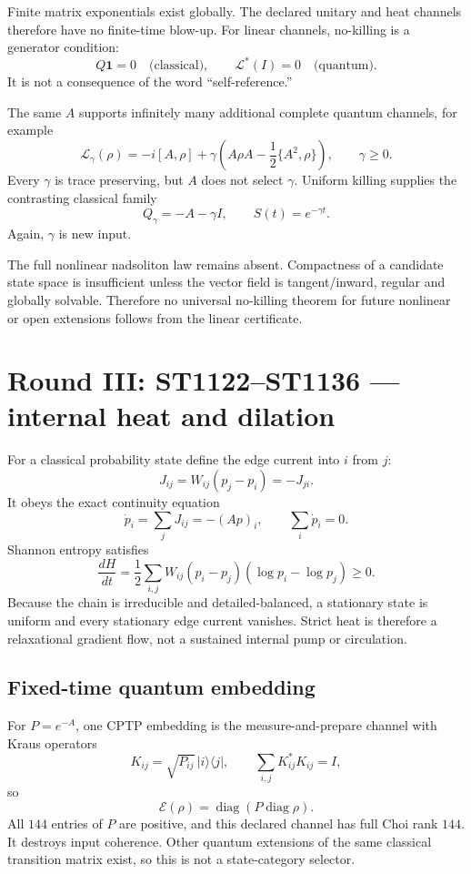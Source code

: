 \documentclass[11pt,a4paper]{article}
\begin{document}
Finite matrix exponentials exist globally.  The declared unitary and heat
channels therefore have no finite-time blow-up.  For linear channels,
no-killing is a generator condition:
\[
 Q\mathbf1=0
 \quad\text{(classical)},
 \qquad
 \mathcal L^*(I)=0
 \quad\text{(quantum)}.
\]
It is not a consequence of the word ``self-reference.''

The same $A$ supports infinitely many additional complete quantum channels,
for example
\[
 \mathcal L_\gamma(\rho)
 =-i[A,\rho]
 +\gamma\left(A\rho A-\frac12\{A^2,\rho\}\right),
 \qquad \gamma\ge0.
\]
Every $\gamma$ is trace preserving, but $A$ does not select $\gamma$.  Uniform
killing supplies the contrasting classical family
\[
 Q_\gamma=-A-\gamma I,
 \qquad S(t)=e^{-\gamma t}.
\]
Again, $\gamma$ is new input.

The full nonlinear nadsoliton law remains absent.  Compactness of a candidate
state space is insufficient unless the vector field is tangent/inward,
regular and globally solvable.  Therefore no universal no-killing theorem for
future nonlinear or open extensions follows from the linear certificate.

\section{Round III: ST1122--ST1136 --- internal heat and dilation}

For a classical probability state define the edge current into $i$ from $j$:
\[
 J_{ij}=W_{ij}(p_j-p_i)=-J_{ji}.
\]
It obeys the exact continuity equation
\[
 \dot p_i=\sum_jJ_{ij}=-(Ap)_i,
 \qquad \sum_i\dot p_i=0.
\]
Shannon entropy satisfies
\[
 \frac{dH}{dt}
 =\frac12\sum_{i,j}W_{ij}(p_i-p_j)(\log p_i-\log p_j)\ge0.
\]
Because the chain is irreducible and detailed-balanced, a stationary state is
uniform and every stationary edge current vanishes.  Strict heat is therefore
a relaxational gradient flow, not a sustained internal pump or circulation.

\subsection{Fixed-time quantum embedding}

For $P=e^{-A}$, one CPTP embedding is the measure-and-prepare channel with
Kraus operators
\[
 K_{ij}=\sqrt{P_{ij}}\,|i\rangle\langle j|,
 \qquad
 \sum_{i,j}K_{ij}^*K_{ij}=I,
\]
so
\[
 \mathcal E(\rho)=\operatorname{diag}(P\operatorname{diag}\rho).
\]
All $144$ entries of $P$ are positive, and this declared channel has full Choi
rank $144$.  It destroys input coherence.  Other quantum extensions of the
same classical transition matrix exist, so this is not a state-category
selector.
\end{document}
